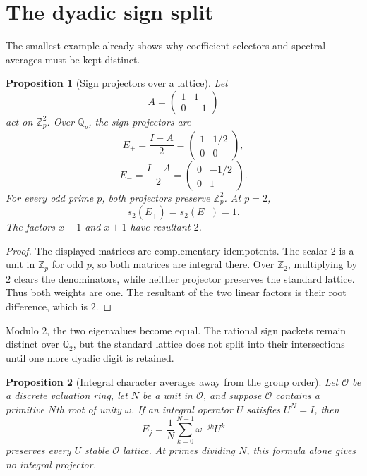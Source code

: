 \documentclass{aomart}
\newtheorem{proposition}[proposition]{Proposition}
\theoremstyle{definition}
\theoremstyle{remark}
\newcommand{\OO}{\mathcal O}
\begin{document}
\section{The dyadic sign split}\label{sec:dyadic}

The smallest example already shows why coefficient selectors and spectral averages must be kept distinct.

\begin{proposition}[Sign projectors over a lattice]\label{prop:sign_projectors}
Let
\[
A=
\begin{pmatrix}
1&1\\
0&-1
\end{pmatrix}
\]
act on $\mathbb Z_p^2$.  Over $\mathbb Q_p$, the sign projectors are
\[
E_+=\frac{I+A}{2}
=
\begin{pmatrix}
1&1/2\\
0&0
\end{pmatrix},
\]
\[
E_-=\frac{I-A}{2}
=
\begin{pmatrix}
0&-1/2\\
0&1
\end{pmatrix}.
\]
For every odd prime $p$, both projectors preserve $\mathbb Z_p^2$.  At $p=2$,
\[
s_2(E_+)=s_2(E_-)=1.
\]
The factors $x-1$ and $x+1$ have resultant $2$.
\end{proposition}

\begin{proof}
The displayed matrices are complementary idempotents.  The scalar $2$ is a unit in $\mathbb Z_p$ for odd $p$, so both matrices are integral there.  Over $\mathbb Z_2$, multiplying by $2$ clears the denominators, while neither projector preserves the standard lattice.  Thus both weights are one.  The resultant of the two linear factors is their root difference, which is $2$.
\end{proof}

Modulo $2$, the two eigenvalues become equal.  The rational sign packets remain distinct over $\mathbb Q_2$, but the standard lattice does not split into their intersections until one more dyadic digit is retained.

\begin{proposition}[Integral character averages away from the group order]\label{prop:character_integrality}
Let $\OO$ be a discrete valuation ring, let $N$ be a unit in $\OO$, and suppose $\OO$ contains a primitive $N$th root of unity $\omega$.  If an integral operator $U$ satisfies $U^N=I$, then
\[
E_j=\frac1N\sum_{k=0}^{N-1}\omega^{-jk}U^k
\]
preserves every $U$ stable $\OO$ lattice.  At primes dividing $N$, this formula alone gives no integral projector.
\end{proposition}
\end{document}
